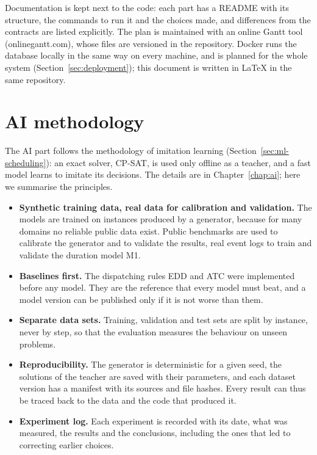 Documentation is kept next to the code: each part has a README with its structure, the commands
to run it and the choices made, and differences from the contracts are listed explicitly. The
plan is maintained with an online Gantt tool (onlinegantt.com), whose files are versioned in the
repository. Docker runs the database locally in the same way on every machine, and is planned
for the whole system (Section~\ref{sec:deployment}); this document is written in LaTeX in the
same repository.

\section{AI methodology}
\label{sec:ai-methodology}

The AI part follows the methodology of imitation learning (Section~\ref{sec:ml-scheduling}):
an exact solver, CP-SAT, is used only offline as a teacher, and a fast model learns to imitate
its decisions. The details are in Chapter~\ref{chap:ai}; here we summarise the principles.
\begin{itemize}
  \item \textbf{Synthetic training data, real data for calibration and validation.} The models
        are trained on instances produced by a generator, because for many domains no reliable
        public data exist. Public benchmarks are used to calibrate the generator and to validate
        the results, real event logs to train and validate the duration model M1.
  \item \textbf{Baselines first.} The dispatching rules EDD and ATC were implemented before any
        model. They are the reference that every model must beat, and a model version can be
        published only if it is not worse than them.
  \item \textbf{Separate data sets.} Training, validation and test sets are split by instance,
        never by step, so that the evaluation measures the behaviour on unseen problems.
  \item \textbf{Reproducibility.} The generator is deterministic for a given seed, the
        solutions of the teacher are saved with their parameters, and each dataset version has a
        manifest with its sources and file hashes. Every result can thus be traced back to the
        data and the code that produced it.
  \item \textbf{Experiment log.} Each experiment is recorded with its date, what was measured,
        the results and the conclusions, including the ones that led to correcting earlier
        choices.
\end{itemize}

